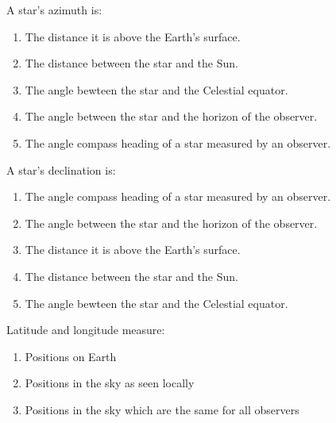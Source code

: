 \documentclass[11pt]{article}
\begin{document}
\begin{enumerate}
\setlength{\itemsep}{1pt} 
\setlength{\parskip}{0pt} 
\setlength{\parsep}{0pt}
\setlength{\multicolsep}{1pt} 

\begin{minipage}{\textwidth}
\begin{minipage}{\textwidth}
\item A star's azimuth is:
\begin{enumerate} 
\setlength{\itemsep}{1pt} 
\setlength{\parskip}{0pt} 
\setlength{\parsep}{0pt}
\setlength{\multicolsep}{1pt} 
\item The distance it is above the Earth's surface.
\item The distance between the star and the Sun.
\item The angle bewteen the star and the Celestial equator.
\item The angle between the star and the horizon of the observer.
\item The angle compass heading of a star measured by an observer.
\end{enumerate} 
\end{minipage}
\end{minipage}
\vskip 0.20in

\begin{minipage}{\textwidth}
\begin{minipage}{\textwidth}
\item A star's declination is:
\begin{enumerate} 
\setlength{\itemsep}{1pt} 
\setlength{\parskip}{0pt} 
\setlength{\parsep}{0pt}
\setlength{\multicolsep}{1pt} 
\item The angle compass heading of a star measured by an observer.
\item The angle between the star and the horizon of the observer.
\item The distance it is above the Earth's surface.
\item The distance between the star and the Sun.
\item The angle bewteen the star and the Celestial equator.
\end{enumerate} 
\end{minipage}
\end{minipage}
\vskip 0.20in

\begin{minipage}{\textwidth}
\begin{minipage}{\textwidth}
\item Latitude and longitude measure:
\begin{enumerate} 
\setlength{\itemsep}{1pt} 
\setlength{\parskip}{0pt} 
\setlength{\parsep}{0pt}
\setlength{\multicolsep}{1pt} 
\item Positions on Earth
\item Positions in the sky as seen locally
\item Positions in the sky which are the same for all observers
\end{enumerate} 
\end{minipage}
\end{minipage}
\vskip 0.20in


\end{enumerate}
\end{document}
